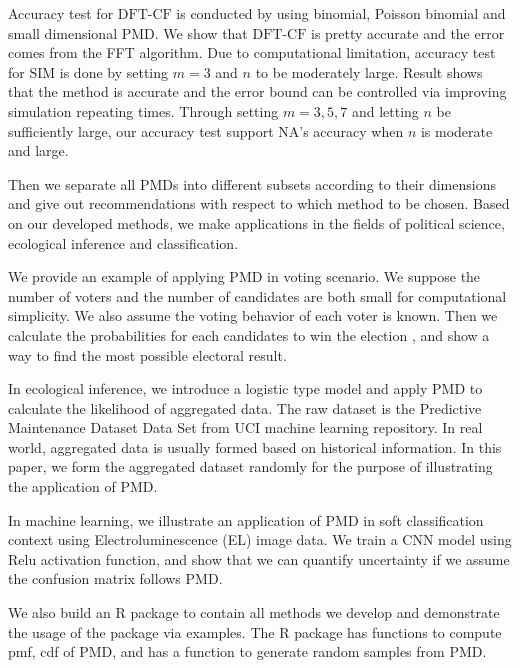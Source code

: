 \documentclass[12pt]{article}
\newcommand{\PMD}{\textrm{PMD}}
\newcommand{\SIM}{{\textrm{SIM}}}
\newcommand{\NA}{{\textrm{NA}}}
\newcommand{\dft}{{\textrm{DFT-CF}}}
\begin{document}
Accuracy test for $\dft$ is conducted by using binomial, Poisson binomial and small dimensional $\PMD$. We show that $\dft$ is pretty accurate and the error comes from the FFT algorithm. Due to computational limitation, accuracy test for $\SIM$ is done by setting $m=3$ and $n$ to be moderately large. Result shows that the method is accurate and the error bound can be controlled via improving simulation repeating times. Through setting $m=3,5,7$ and letting $n$ be sufficiently large, our accuracy test support $\NA$'s accuracy when $n$ is moderate and large.

Then we separate all $\PMD$s into different subsets according to their dimensions and give out recommendations with respect to which method to be chosen. Based on our developed methods, we make applications in the fields of political science, ecological inference and classification.

 We provide an example of applying $\PMD$ in voting scenario. We suppose the number of voters and the number of candidates are both small for computational simplicity. We also assume the voting behavior of each voter is known. Then we calculate the probabilities for each candidates to win the election , and show a way to find the most possible electoral result. 
 
In ecological inference, we introduce a logistic type model and apply $\PMD$ to calculate the likelihood of aggregated data. The raw dataset is the Predictive Maintenance Dataset Data Set \cite{Dua:2019} from UCI machine learning repository. In real world, aggregated data is usually formed based on historical information. In this paper, we form the aggregated dataset randomly for the purpose of illustrating the application of $\PMD$.

In machine learning, we illustrate an application of $\PMD$ in soft classification context using Electroluminescence (EL) image data. We train a CNN model using Relu activation function, and show that we can quantify uncertainty if we assume the confusion matrix follows $\PMD$.

We also build an R package to contain all methods we develop and demonstrate the usage of the package via examples. The R package has functions to compute pmf, cdf of $\PMD$, and has a function to generate random samples from $\PMD$.
\end{document}
